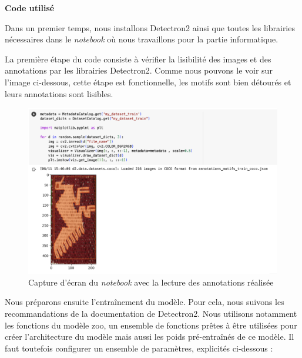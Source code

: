 \documentclass[a4paper, twoside, 12pt]{book}
\begin{document}
\textbf{Code utilisé}

Dans un premier temps, nous installons Detectron2 ainsi que toutes les librairies nécessaires dans le \textit{notebook} où nous travaillons pour la partie informatique. 

La première étape du code consiste à vérifier la lisibilité des images et des annotations par les librairies Detectron2. Comme nous pouvons le voir sur l'image ci-dessous, cette étape est fonctionnelle, les motifs sont bien détourés et leurs annotations sont lisibles.

\begin{figure}[!h]
    \centering
    \includegraphics[width=15cm]{images/verifLecture.png}
    \caption{Capture d'écran du \textit{notebook} avec la lecture des annotations réalisée}
    \label{verifImgDetectron2} 
\end{figure}

Nous préparons ensuite l'entraînement du modèle. Pour cela, nous suivons les recommandations de la documentation de Detectron2. Nous utilisons notamment les fonctions du modèle zoo, un ensemble de fonctions prêtes à être utilisées pour créer l'architecture du modèle mais aussi les poids pré-entraînés de ce modèle. Il faut toutefois configurer un ensemble de paramètres, explicités ci-dessous : 
\end{document}
